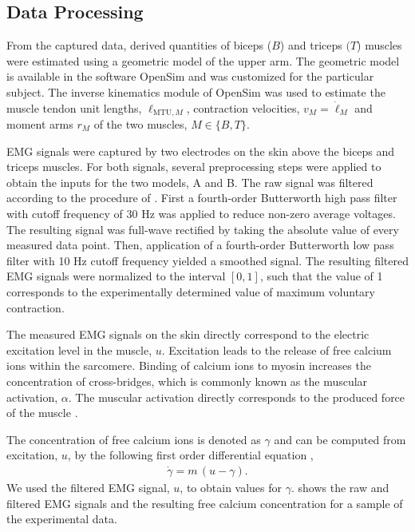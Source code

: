 \subsection{Data Processing}
From the captured data, derived quantities of biceps ($B$) and triceps $(T$) muscles were estimated using a geometric model of the upper arm. 
The geometric model is available in the software OpenSim \cite{OpenSim2007} and was customized for the particular subject. The inverse kinematics module of OpenSim was used to estimate the muscle tendon unit lengths, $\ell_{\text{MTU},M}$, contraction velocities, $v_M=\dot{\ell}_M$ and moment arms $r_{M}$ of the two muscles, $M\in\{B,T\}$.

EMG signals were captured by two electrodes on the skin above the biceps and triceps muscles. For both signals, several preprocessing steps were applied to obtain the inputs for the two models, A and B.
The raw signal was filtered according to the procedure of \cite{Falisse2016}. First a fourth-order Butterworth high pass filter with cutoff frequency of 30 Hz was applied to reduce non-zero average voltages. The resulting signal was full-wave rectified by taking the absolute value of every measured data point. Then, application of a fourth-order Butterworth low pass filter with 10 Hz cutoff frequency yielded a smoothed signal.
The resulting filtered EMG signals were normalized to the interval $[0,1]$, such that the value of 1 corresponds to the experimentally determined value of maximum voluntary contraction.

The measured EMG signals on the skin directly correspond to the electric excitation level in the muscle, $u$. Excitation leads to the release of free calcium ions within the sarcomere. Binding of calcium ions to myosin increases the concentration of cross-bridges, which is commonly known as the muscular activation, $\alpha$. The muscular activation directly corresponds to the produced force of the muscle \cite{Bayer2017}.

The concentration of free calcium ions is denoted as $\gamma$ and can be computed from excitation, $u$, by the following first order differential equation \cite{Hatze1977},
%
\begin{equation*}
  \begin{array}{lll}
    \dot{\gamma} = m\,(u - \gamma).
  \end{array}
\end{equation*}
%
We used the filtered EMG signal, $u$, to obtain values for $\gamma$.  shows the raw and filtered EMG signals and the resulting free calcium concentration for a sample of the experimental data.

